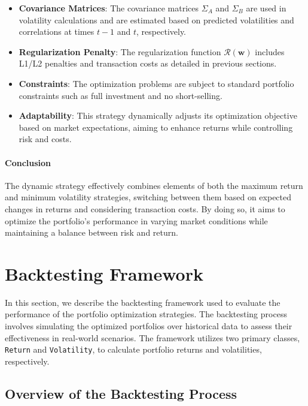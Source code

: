 \begin{itemize}
    \item \textbf{Covariance Matrices}: The covariance matrices \( \Sigma_A \) and \( \Sigma_B \) are used in volatility calculations and are estimated based on predicted volatilities and correlations at times \( t-1 \) and \( t \), respectively.
    \item \textbf{Regularization Penalty}: The regularization function \( \mathcal{R}(\mathbf{w}) \) includes L1/L2 penalties and transaction costs as detailed in previous sections.
    \item \textbf{Constraints}: The optimization problems are subject to standard portfolio constraints such as full investment and no short-selling.
    \item \textbf{Adaptability}: This strategy dynamically adjusts its optimization objective based on market expectations, aiming to enhance returns while controlling risk and costs.
\end{itemize}

\paragraph{Conclusion}

The dynamic strategy effectively combines elements of both the maximum return and minimum volatility strategies, switching between them based on expected changes in returns and considering transaction costs. By doing so, it aims to optimize the portfolio's performance in varying market conditions while maintaining a balance between risk and return.


\section{Backtesting Framework}

In this section, we describe the backtesting framework used to evaluate the performance of the portfolio optimization strategies. The backtesting process involves simulating the optimized portfolios over historical data to assess their effectiveness in real-world scenarios. The framework utilizes two primary classes, \texttt{Return} and \texttt{Volatility}, to calculate portfolio returns and volatilities, respectively.

\subsection{Overview of the Backtesting Process}

